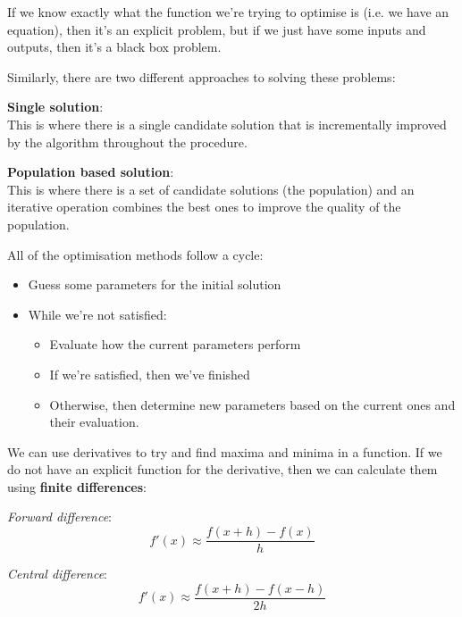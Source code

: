 If we know exactly what the function we're trying to optimise is (i.e. we have
an equation), then it's an explicit problem, but if we just have some inputs and
outputs, then it's a black box problem.

Similarly, there are two different approaches to solving these problems:

\begin{description}
  \item \textbf{Single solution}:\\
   This is where there is a single candidate solution that is incrementally 
   improved by the algorithm throughout the procedure.
  \item \textbf{Population based solution}:\\
    This is where there is a set of candidate solutions (the population) and an
    iterative operation combines the best ones to improve the quality of the 
    population.
\end{description}

All of the optimisation methods follow a cycle:

\begin{itemize}
  \item Guess some parameters for the initial solution
  \item While we're not satisfied:
  \begin{itemize}
    \item Evaluate how the current parameters perform
    \item If we're satisfied, then we've finished
    \item Otherwise, then determine new parameters based on the current ones
      and their evaluation.
  \end{itemize}
\end{itemize}

We can use derivatives to try and find maxima and minima in a function. If we do
not have an explicit function for the derivative, then we can calculate them
using \textbf{finite differences}:

\begin{description}
  \item \textit{Forward difference}:\\
    \[
      f'(x) \approx \frac{f(x + h) - f(x)}{h}
    \]
  \item \textit{Central difference}:\\
    \[
      f'(x) \approx \frac{f(x + h) - f(x - h)}{2h}
    \]
\end{description}

